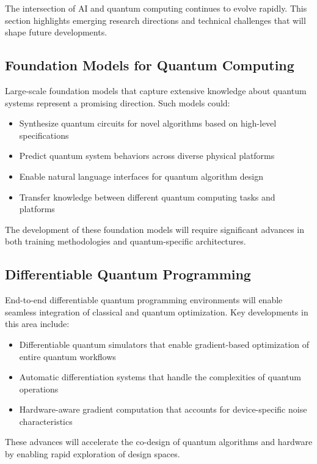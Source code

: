 The intersection of AI and quantum computing continues to evolve rapidly. This section highlights emerging research directions and technical challenges that will shape future developments.

\subsection{Foundation Models for Quantum Computing}
Large-scale foundation models that capture extensive knowledge about quantum systems represent a promising direction. Such models could:

\begin{itemize}
    \item Synthesize quantum circuits for novel algorithms based on high-level specifications
    \item Predict quantum system behaviors across diverse physical platforms
    \item Enable natural language interfaces for quantum algorithm design
    \item Transfer knowledge between different quantum computing tasks and platforms
\end{itemize}

The development of these foundation models will require significant advances in both training methodologies and quantum-specific architectures.

\subsection{Differentiable Quantum Programming}
End-to-end differentiable quantum programming environments will enable seamless integration of classical and quantum optimization. Key developments in this area include:

\begin{itemize}
    \item Differentiable quantum simulators that enable gradient-based optimization of entire quantum workflows
    \item Automatic differentiation systems that handle the complexities of quantum operations
    \item Hardware-aware gradient computation that accounts for device-specific noise characteristics
\end{itemize}

These advances will accelerate the co-design of quantum algorithms and hardware by enabling rapid exploration of design spaces.

